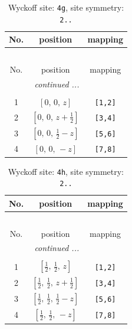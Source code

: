 \documentclass[fleqn,8pt]{jsarticle}
\begin{document}
\renewcommand{\arraystretch}{1.2}
\begin{longtable}{ccc}
\caption{Wyckoff site: {\tt 4g}, site symmetry: {\tt 2..}}
 \\
 \hline \hline
No. & position & mapping \\ \hline \endfirsthead

\multicolumn{2}{l}{\tablename\ \thetable{}} \\
 \hline \hline
No. & position & mapping \\ \hline \endhead

 \hline \hline
\multicolumn{2}{r}{\footnotesize\it continued ...} \\ \endfoot

 \hline \hline
\multicolumn{2}{r}{} \\ \endlastfoot

1 & $\left[ 0,\, 0,\, z \right]$ & {\tt [1,2]} \\ \hline
2 & $\left[ 0,\, 0,\, z + \frac{1}{2} \right]$ & {\tt [3,4]} \\ \hline
3 & $\left[ 0,\, 0,\, \frac{1}{2} - z \right]$ & {\tt [5,6]} \\ \hline
4 & $\left[ 0,\, 0,\, - z \right]$ & {\tt [7,8]} \\
\end{longtable}
\renewcommand{\arraystretch}{1.2}
\begin{longtable}{ccc}
\caption{Wyckoff site: {\tt 4h}, site symmetry: {\tt 2..}}
 \\
 \hline \hline
No. & position & mapping \\ \hline \endfirsthead

\multicolumn{2}{l}{\tablename\ \thetable{}} \\
 \hline \hline
No. & position & mapping \\ \hline \endhead

 \hline \hline
\multicolumn{2}{r}{\footnotesize\it continued ...} \\ \endfoot

 \hline \hline
\multicolumn{2}{r}{} \\ \endlastfoot

1 & $\left[ \frac{1}{2},\, \frac{1}{2},\, z \right]$ & {\tt [1,2]} \\ \hline
2 & $\left[ \frac{1}{2},\, \frac{1}{2},\, z + \frac{1}{2} \right]$ & {\tt [3,4]} \\ \hline
3 & $\left[ \frac{1}{2},\, \frac{1}{2},\, \frac{1}{2} - z \right]$ & {\tt [5,6]} \\ \hline
4 & $\left[ \frac{1}{2},\, \frac{1}{2},\, - z \right]$ & {\tt [7,8]} \\
\end{longtable}
\end{document}
